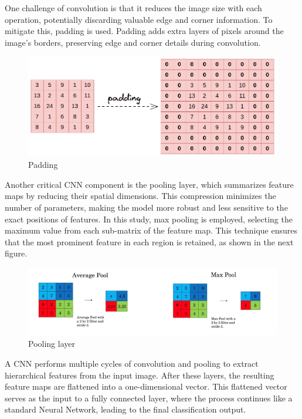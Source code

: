 One challenge of convolution is that it reduces the image size with each operation, potentially discarding valuable edge and corner information. To mitigate this, padding is used. Padding adds extra layers of pixels around the image’s borders, preserving edge and corner details during convolution. 
\begin{figure}[h!]
    \centering
    \includegraphics[width=1\linewidth]{images/padding.png}
    \caption{Padding}
    \label{fig:enter-label}
\end{figure}


Another critical CNN component is the pooling layer, which summarizes feature maps by reducing their spatial dimensions. This compression minimizes the number of parameters, making the model more robust and less sensitive to the exact positions of features. In this study, max pooling is employed, selecting the maximum value from each sub-matrix of the feature map. This technique ensures that the most prominent feature in each region is retained, as shown in the next figure.

\begin{figure}[h!]
    \centering
    \includegraphics[width=1\linewidth]{images/Pooling.png}
    \caption{Pooling layer}
    \label{fig:enter-label}
\end{figure}


A CNN performs multiple cycles of convolution and pooling to extract hierarchical features from the input image. After these layers, the resulting feature maps are flattened into a one-dimensional vector. This flattened vector serves as the input to a fully connected layer, where the process continues like a standard Neural Network, leading to the final classification output.


